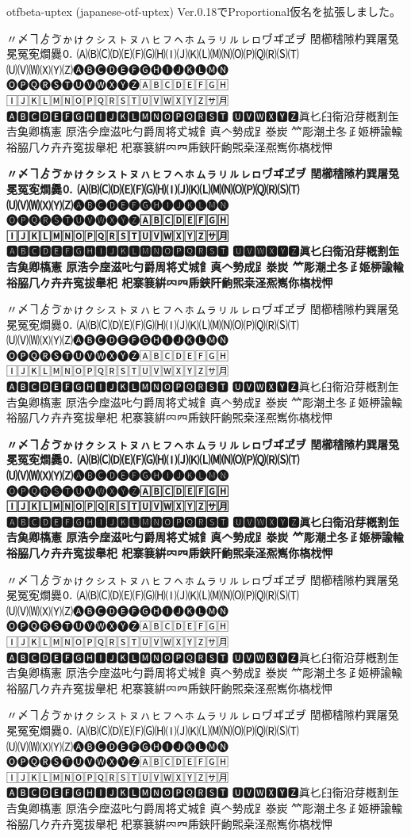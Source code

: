 \documentclass[a4paper,titlepage, draft]{\class}
\begin{document}
\ifuptexmode
otfbeta-uptex (japanese-otf-uptex) Ver.0.18でProportional仮名を拡張しました。

{\propshape
\noindent 〃〆ヿゟゔゕゖㇰㇱㇲㇳㇴㇵㇶㇷㇸㇹㇺㇻㇼㇽㇾㇿヷヸヹヺ
𨳝櫛𥡴𨻶杓巽屠兔冕冤𡨚𤏐爨🄀
🄐🄑🄒🄓🄔🄕🄖🄗🄘🄙🄚🄛🄜🄝🄞🄟🄠🄡🄢🄣
🄤🄥🄦🄧🄨🄩🅐🅑🅒🅓🅔🅕🅖🅗🅘🅙🅚🅛🅜🅝
🅞🅟🅠🅡🅢🅣🅤🅥🅦🅧🅨🅩🄰🄱🄲🄳🄴🄵🄶🄷
🄸🄹🄺🄻🄼🄽🄾🄿🅀🅁🅂🅃🅄🅅🅆🅇🅈🅉🈂🈷
🅰🅱🅲🅳🅴🅵🅶🅷🅸🅹🅺🅻🅼🅽🅾🅿🆀🆁🆂🆃
🆄🆅🆆🆇🆈🆉眞𠤎𦥑𫟘沿芽槪割𦈢𠮷𩵋卿𫞎憲
𠩤浩𫝆𫝷滋𠮟勺爵周将𠀋城𩙿真𠆢𫝑成𧾷𣳾炭
𥫗彫潮𡈽冬𤴔姬𫞉諭輸𥙿𦚰𠘨𠂊𠦄卉寃拔𦦙𣏌
杞𪧦𫞽絣𠔿𦉪𠂰𨦇𨸗𫠚𤋮桒𣲾𠘑嶲你𣘺𣏾𢘉

\bfseries
\noindent 〃〆ヿゟゔゕゖㇰㇱㇲㇳㇴㇵㇶㇷㇸㇹㇺㇻㇼㇽㇾㇿヷヸヹヺ
𨳝櫛𥡴𨻶杓巽屠兔冕冤𡨚𤏐爨🄀
🄐🄑🄒🄓🄔🄕🄖🄗🄘🄙🄚🄛🄜🄝🄞🄟🄠🄡🄢🄣
🄤🄥🄦🄧🄨🄩🅐🅑🅒🅓🅔🅕🅖🅗🅘🅙🅚🅛🅜🅝
🅞🅟🅠🅡🅢🅣🅤🅥🅦🅧🅨🅩🄰🄱🄲🄳🄴🄵🄶🄷
🄸🄹🄺🄻🄼🄽🄾🄿🅀🅁🅂🅃🅄🅅🅆🅇🅈🅉🈂🈷
🅰🅱🅲🅳🅴🅵🅶🅷🅸🅹🅺🅻🅼🅽🅾🅿🆀🆁🆂🆃
🆄🆅🆆🆇🆈🆉眞𠤎𦥑𫟘沿芽槪割𦈢𠮷𩵋卿𫞎憲
𠩤浩𫝆𫝷滋𠮟勺爵周将𠀋城𩙿真𠆢𫝑成𧾷𣳾炭
𥫗彫潮𡈽冬𤴔姬𫞉諭輸𥙿𦚰𠘨𠂊𠦄卉寃拔𦦙𣏌
杞𪧦𫞽絣𠔿𦉪𠂰𨦇𨸗𫠚𤋮桒𣲾𠘑嶲你𣘺𣏾𢘉
}

{\gtfamily\mdseries\propshape
\noindent 〃〆ヿゟゔゕゖㇰㇱㇲㇳㇴㇵㇶㇷㇸㇹㇺㇻㇼㇽㇾㇿヷヸヹヺ
𨳝櫛𥡴𨻶杓巽屠兔冕冤𡨚𤏐爨🄀
🄐🄑🄒🄓🄔🄕🄖🄗🄘🄙🄚🄛🄜🄝🄞🄟🄠🄡🄢🄣
🄤🄥🄦🄧🄨🄩🅐🅑🅒🅓🅔🅕🅖🅗🅘🅙🅚🅛🅜🅝
🅞🅟🅠🅡🅢🅣🅤🅥🅦🅧🅨🅩🄰🄱🄲🄳🄴🄵🄶🄷
🄸🄹🄺🄻🄼🄽🄾🄿🅀🅁🅂🅃🅄🅅🅆🅇🅈🅉🈂🈷
🅰🅱🅲🅳🅴🅵🅶🅷🅸🅹🅺🅻🅼🅽🅾🅿🆀🆁🆂🆃
🆄🆅🆆🆇🆈🆉眞𠤎𦥑𫟘沿芽槪割𦈢𠮷𩵋卿𫞎憲
𠩤浩𫝆𫝷滋𠮟勺爵周将𠀋城𩙿真𠆢𫝑成𧾷𣳾炭
𥫗彫潮𡈽冬𤴔姬𫞉諭輸𥙿𦚰𠘨𠂊𠦄卉寃拔𦦙𣏌
杞𪧦𫞽絣𠔿𦉪𠂰𨦇𨸗𫠚𤋮桒𣲾𠘑嶲你𣘺𣏾𢘉

\bfseries\propshape
\noindent 〃〆ヿゟゔゕゖㇰㇱㇲㇳㇴㇵㇶㇷㇸㇹㇺㇻㇼㇽㇾㇿヷヸヹヺ
𨳝櫛𥡴𨻶杓巽屠兔冕冤𡨚𤏐爨🄀
🄐🄑🄒🄓🄔🄕🄖🄗🄘🄙🄚🄛🄜🄝🄞🄟🄠🄡🄢🄣
🄤🄥🄦🄧🄨🄩🅐🅑🅒🅓🅔🅕🅖🅗🅘🅙🅚🅛🅜🅝
🅞🅟🅠🅡🅢🅣🅤🅥🅦🅧🅨🅩🄰🄱🄲🄳🄴🄵🄶🄷
🄸🄹🄺🄻🄼🄽🄾🄿🅀🅁🅂🅃🅄🅅🅆🅇🅈🅉🈂🈷
🅰🅱🅲🅳🅴🅵🅶🅷🅸🅹🅺🅻🅼🅽🅾🅿🆀🆁🆂🆃
🆄🆅🆆🆇🆈🆉眞𠤎𦥑𫟘沿芽槪割𦈢𠮷𩵋卿𫞎憲
𠩤浩𫝆𫝷滋𠮟勺爵周将𠀋城𩙿真𠆢𫝑成𧾷𣳾炭
𥫗彫潮𡈽冬𤴔姬𫞉諭輸𥙿𦚰𠘨𠂊𠦄卉寃拔𦦙𣏌
杞𪧦𫞽絣𠔿𦉪𠂰𨦇𨸗𫠚𤋮桒𣲾𠘑嶲你𣘺𣏾𢘉
}

{\mgfamily\propshape
\noindent 〃〆ヿゟゔゕゖㇰㇱㇲㇳㇴㇵㇶㇷㇸㇹㇺㇻㇼㇽㇾㇿヷヸヹヺ
𨳝櫛𥡴𨻶杓巽屠兔冕冤𡨚𤏐爨🄀
🄐🄑🄒🄓🄔🄕🄖🄗🄘🄙🄚🄛🄜🄝🄞🄟🄠🄡🄢🄣
🄤🄥🄦🄧🄨🄩🅐🅑🅒🅓🅔🅕🅖🅗🅘🅙🅚🅛🅜🅝
🅞🅟🅠🅡🅢🅣🅤🅥🅦🅧🅨🅩🄰🄱🄲🄳🄴🄵🄶🄷
🄸🄹🄺🄻🄼🄽🄾🄿🅀🅁🅂🅃🅄🅅🅆🅇🅈🅉🈂🈷
🅰🅱🅲🅳🅴🅵🅶🅷🅸🅹🅺🅻🅼🅽🅾🅿🆀🆁🆂🆃
🆄🆅🆆🆇🆈🆉眞𠤎𦥑𫟘沿芽槪割𦈢𠮷𩵋卿𫞎憲
𠩤浩𫝆𫝷滋𠮟勺爵周将𠀋城𩙿真𠆢𫝑成𧾷𣳾炭
𥫗彫潮𡈽冬𤴔姬𫞉諭輸𥙿𦚰𠘨𠂊𠦄卉寃拔𦦙𣏌
杞𪧦𫞽絣𠔿𦉪𠂰𨦇𨸗𫠚𤋮桒𣲾𠘑嶲你𣘺𣏾𢘉
}

{\gtfamily\ebseries
\noindent 〃〆ヿゟゔゕゖㇰㇱㇲㇳㇴㇵㇶㇷㇸㇹㇺㇻㇼㇽㇾㇿヷヸヹヺ
𨳝櫛𥡴𨻶杓巽屠兔冕冤𡨚𤏐爨🄀
🄐🄑🄒🄓🄔🄕🄖🄗🄘🄙🄚🄛🄜🄝🄞🄟🄠🄡🄢🄣
🄤🄥🄦🄧🄨🄩🅐🅑🅒🅓🅔🅕🅖🅗🅘🅙🅚🅛🅜🅝
🅞🅟🅠🅡🅢🅣🅤🅥🅦🅧🅨🅩🄰🄱🄲🄳🄴🄵🄶🄷
🄸🄹🄺🄻🄼🄽🄾🄿🅀🅁🅂🅃🅄🅅🅆🅇🅈🅉🈂🈷
🅰🅱🅲🅳🅴🅵🅶🅷🅸🅹🅺🅻🅼🅽🅾🅿🆀🆁🆂🆃
🆄🆅🆆🆇🆈🆉眞𠤎𦥑𫟘沿芽槪割𦈢𠮷𩵋卿𫞎憲
𠩤浩𫝆𫝷滋𠮟勺爵周将𠀋城𩙿真𠆢𫝑成𧾷𣳾炭
𥫗彫潮𡈽冬𤴔姬𫞉諭輸𥙿𦚰𠘨𠂊𠦄卉寃拔𦦙𣏌
杞𪧦𫞽絣𠔿𦉪𠂰𨦇𨸗𫠚𤋮桒𣲾𠘑嶲你𣘺𣏾𢘉
}
\fi
\end{document}
